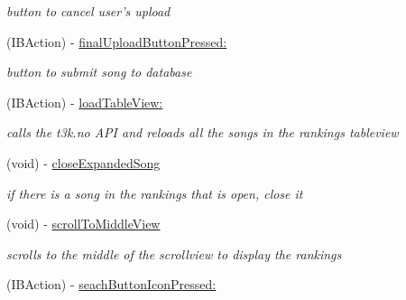 \begin{DoxyCompactItemize}
\begin{DoxyCompactList}\small\item\em button to cancel user's upload \end{DoxyCompactList}\item 
(I\-B\-Action) -\/ \hyperlink{interface_c_b_h_view_controller_a112c0996342c1157f8f97e35379505c9}{final\-Upload\-Button\-Pressed\-:}
\begin{DoxyCompactList}\small\item\em button to submit song to database \end{DoxyCompactList}\item 
\hypertarget{interface_c_b_h_view_controller_acc69c70bc3daf4b1f866daf1e5c4092a}{(I\-B\-Action) -\/ \hyperlink{interface_c_b_h_view_controller_acc69c70bc3daf4b1f866daf1e5c4092a}{load\-Table\-View\-:}}\label{interface_c_b_h_view_controller_acc69c70bc3daf4b1f866daf1e5c4092a}

\begin{DoxyCompactList}\small\item\em calls the t3k.\-no A\-P\-I and reloads all the songs in the rankings tableview \end{DoxyCompactList}\item 
\hypertarget{interface_c_b_h_view_controller_adb9fb70bbecec4344a92a06c1d436a06}{(void) -\/ \hyperlink{interface_c_b_h_view_controller_adb9fb70bbecec4344a92a06c1d436a06}{close\-Expanded\-Song}}\label{interface_c_b_h_view_controller_adb9fb70bbecec4344a92a06c1d436a06}

\begin{DoxyCompactList}\small\item\em if there is a song in the rankings that is open, close it \end{DoxyCompactList}\item 
\hypertarget{interface_c_b_h_view_controller_a15e99e8724f638386f2042f51c757909}{(void) -\/ \hyperlink{interface_c_b_h_view_controller_a15e99e8724f638386f2042f51c757909}{scroll\-To\-Middle\-View}}\label{interface_c_b_h_view_controller_a15e99e8724f638386f2042f51c757909}

\begin{DoxyCompactList}\small\item\em scrolls to the middle of the scrollview to display the rankings \end{DoxyCompactList}\item 
\hypertarget{interface_c_b_h_view_controller_aa423e4fbca3bb0d3aa430d6220ac548d}{(I\-B\-Action) -\/ \hyperlink{interface_c_b_h_view_controller_aa423e4fbca3bb0d3aa430d6220ac548d}{seach\-Button\-Icon\-Pressed\-:}}\label{interface_c_b_h_view_controller_aa423e4fbca3bb0d3aa430d6220ac548d}


\end{DoxyCompactItemize}
